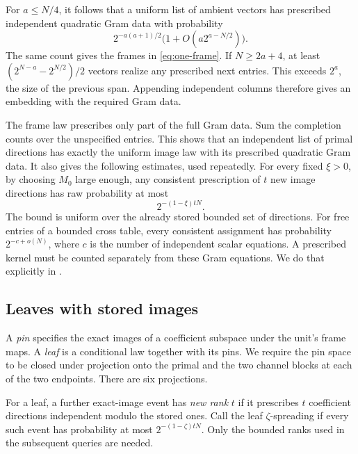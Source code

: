 For \(a\le N/4\), it follows that a uniform list of ambient vectors has
prescribed independent quadratic Gram data with probability
\begin{equation}\label{eq:quadratic-gram-count}
 2^{-a(a+1)/2}\bigl(1+O(a2^{a-N/2})\bigr).
\end{equation}
The same count gives the frames in \eqref{eq:one-frame}. If
\(N\ge 2a+4\), at least \((2^{N-a}-2^{N/2})/2\) vectors realize
any prescribed next entries. This exceeds \(2^a\), the size of the
previous span. Appending independent columns therefore gives an embedding
with the required Gram data.

The frame law prescribes only part of the full Gram data. Sum the completion
counts over the unspecified entries. This shows that an independent list
of primal directions has exactly the uniform image law with its prescribed
quadratic Gram data. It also gives the following estimates, used repeatedly.
For every fixed \(\xi>0\), by choosing \(M_0\) large enough, any consistent
prescription of \(t\) new image directions has raw probability at most
\begin{equation}\label{eq:image-cost}
 2^{-(1-\xi)tN}.
\end{equation}
The bound is uniform over the already stored bounded set of directions.
For free entries of a bounded cross table, every consistent assignment
has probability \(2^{-c+o(N)}\), where \(c\) is the number of independent
scalar equations. A prescribed kernel must be counted separately from
these Gram equations. We do that explicitly in .

\subsection{Leaves with stored images}

A \emph{pin} specifies the exact images of a coefficient subspace under
the unit's frame maps. A \emph{leaf} is a conditional law together with
its pins. We require the pin space to be closed under projection onto the
primal and the two channel blocks at each of the two endpoints.
There are six projections.

For a leaf, a further exact-image event has \emph{new rank} \(t\) if it
prescribes \(t\) coefficient directions independent modulo the stored
ones. Call the leaf \(\zeta\)-spreading if every such event has probability
at most \(2^{-(1-\zeta)tN}\). Only the bounded ranks used in the subsequent
queries are needed.

